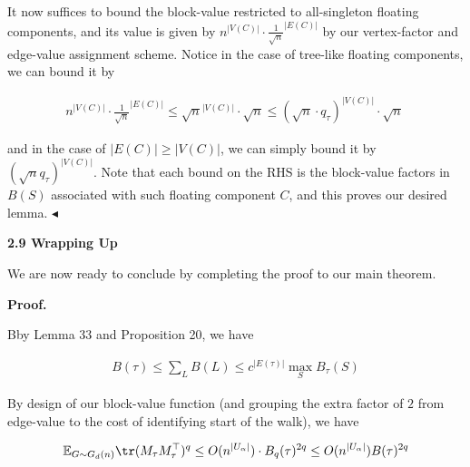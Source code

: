 \documentclass[10pt,a4paper]{article}
\begin{document}
It now suffices to bound the block-value restricted to all-singleton floating components, and its value is given by $n^{|V(C)|}\cdot\frac{1}{\sqrt{n}}^{|E(C)|}$ by our vertex-factor and edge-value assignment scheme. Notice in the case of tree-like floating components, we can bound it by\par


\[\begin{gathered}
n^{|V(C)|}\cdot\frac{1}{\sqrt{n}}^{|E(C)|}\leq\sqrt{n}^{|V(C)|}\cdot\sqrt{n}\leq(\sqrt{n}\cdot q_{\tau})^{|V(C)|}\cdot\sqrt{n}\
\end{gathered}\]


and in the case of $|E(C)|\geq|V(C)|$, we can simply bound it by $(\sqrt{n}q_{\tau})^{|V(C)|}$. Note that each bound on the RHS is the block-value factors in $B(S)$ associated with such floating component $C$, and this proves our desired lemma.
$\blacktriangleleft$\par






\par\medskip\noindent\textbf{
2.9 Wrapping Up}\par




We are now ready to conclude by completing the proof to our main theorem.\par




\par\medskip\noindent\textbf{Proof.}\par




Bby Lemma 33 and Proposition 20, we have\par


\[\begin{gathered}
\displaystyle B(\tau)\leq\sum_{L}B(L)\leq c^{|E(\tau)|}\max_{S}B_{\tau}(S)
\end{gathered}\]




By design of our block-value function (and grouping the extra factor of $2$ from edge-value to the cost of identifying start of the walk), we have\par


\[\begin{gathered}
\mathbb{E}_{G\sim G_{d}(n)}\tr(M_{\tau}M_{\tau}^{\top})^{q}\leq O(n^{|U_{\alpha}|})\cdot B_{q}(\tau)^{2q}\leq O(n^{|U_{\alpha}|})B(\tau)^{2q}
\end{gathered}\]
\end{document}
